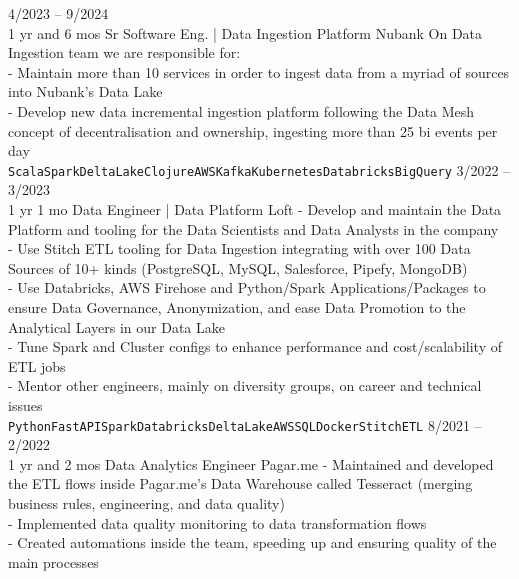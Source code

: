 \documentclass[9pt]{developercv} %
\begin{document}
\begin{entrylist}
	\entry
		{4/2023 -- 9/2024 \\\footnotesize{1 yr and 6 mos}}
		{Sr Software Eng. | Data Ingestion Platform}
		{Nubank}
		{
On Data Ingestion team we are responsible for:
\\ - Maintain more than 10 services in order to ingest data from a myriad of sources into Nubank's Data Lake
\\- Develop new data incremental ingestion platform following the Data Mesh concept of decentralisation and ownership, ingesting more than 25 bi events per day
\\\texttt{Scala}\slashsep\texttt{Spark}\slashsep\texttt{DeltaLake}\slashsep\texttt{Clojure}\slashsep\texttt{AWS}\slashsep\texttt{Kafka}\slashsep\texttt{Kubernetes}\slashsep\texttt{Databricks}\slashsep\texttt{BigQuery}}
	\entry
		{3/2022 -- 3/2023 \\\footnotesize{1 yr 1 mo}}
		{Data Engineer | Data Platform}
		{Loft}
		{- Develop and maintain the Data Platform and tooling for the Data Scientists and Data Analysts in the company
\\- Use Stitch ETL tooling for Data Ingestion integrating with over 100 Data Sources of 10+ kinds (PostgreSQL, MySQL, Salesforce, Pipefy, MongoDB)
\\- Use Databricks, AWS Firehose and Python/Spark Applications/Packages to ensure Data Governance, Anonymization, and ease Data Promotion to the Analytical Layers in our Data Lake
\\- Tune Spark and Cluster configs to enhance performance and cost/scalability of ETL jobs
\\- Mentor other engineers, mainly on diversity groups, on career and technical issues \\ \texttt{Python}\slashsep\texttt{FastAPI}\slashsep\texttt{Spark}\slashsep\texttt{Databricks}\slashsep\texttt{DeltaLake}\slashsep\texttt{AWS}\slashsep\texttt{SQL}\slashsep\texttt{Docker}\slashsep\texttt{StitchETL}}
	\entry
		{8/2021 -- 2/2022 \\\footnotesize{1 yr and 2 mos}}
		{Data Analytics Engineer}
		{Pagar.me}
		{- Maintained and developed the ETL flows inside Pagar.me's Data Warehouse called Tesseract (merging business rules, engineering, and data quality)\\
  - Implemented data quality monitoring to data transformation flows\\
  - Created automations inside the team, speeding up and ensuring quality of the main processes \\
}
\end{entrylist}
\end{document}
